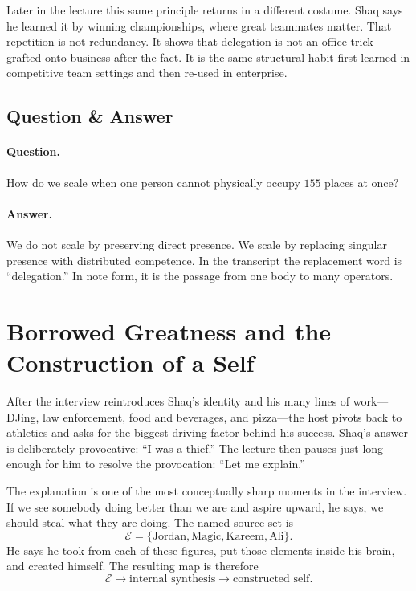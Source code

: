 Later in the lecture this same principle returns in a different costume. Shaq says he learned it by winning championships, where great teammates matter. That repetition is not redundancy. It shows that delegation is not an office trick grafted onto business after the fact. It is the same structural habit first learned in competitive team settings and then re-used in enterprise.

\subsection{Question \& Answer}

\paragraph{Question.} How do we scale when one person cannot physically occupy \(155\) places at once?

\paragraph{Answer.} We do not scale by preserving direct presence. We scale by replacing singular presence with distributed competence. In the transcript the replacement word is ``delegation.'' In note form, it is the passage from one body to many operators.

\section{Borrowed Greatness and the Construction of a Self}

After the interview reintroduces Shaq's identity and his many lines of work---DJing, law enforcement, food and beverages, and pizza---the host pivots back to athletics and asks for the biggest driving factor behind his success. Shaq's answer is deliberately provocative: ``I was a thief.'' The lecture then pauses just long enough for him to resolve the provocation: ``Let me explain.''

The explanation is one of the most conceptually sharp moments in the interview. If we see somebody doing better than we are and aspire upward, he says, we should steal what they are doing. The named source set is
\begin{equation}
\mathcal{E}=\{\text{Jordan},\text{Magic},\text{Kareem},\text{Ali}\}.
\end{equation}
He says he took from each of these figures, put those elements inside his brain, and created himself. The resulting map is therefore
\begin{equation}
\mathcal{E} \to \text{internal synthesis} \to \text{constructed self}.
\end{equation}

